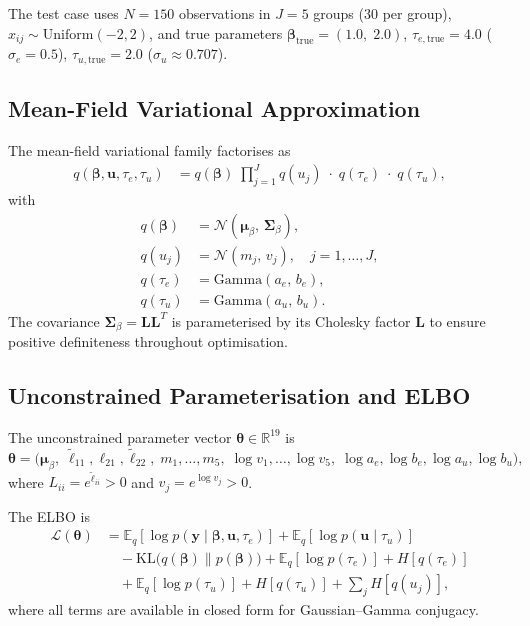 \documentclass[11pt,a4paper]{article}
\newcommand{\E}{\mathbb{E}}
\newcommand{\R}{\mathbb{R}}
\newcommand{\N}{\mathcal{N}}
\begin{document}
The test case uses $N=150$ observations in $J=5$ groups (30 per group),
$x_{ij} \sim \mathrm{Uniform}(-2,2)$, and true parameters
$\bm{\beta}_{\mathrm{true}} = (1.0,\; 2.0)$,
$\tau_{e,\mathrm{true}}=4.0$ ($\sigma_e = 0.5$),
$\tau_{u,\mathrm{true}}=2.0$ ($\sigma_u \approx 0.707$).

\subsection{Mean-Field Variational Approximation}

The mean-field variational family factorises as
\begin{align}
  q(\bm{\beta},\mathbf{u},\tau_e,\tau_u)
  &= q(\bm{\beta})\;\prod_{j=1}^{J} q(u_j)\;\cdot\; q(\tau_e)\;\cdot\; q(\tau_u),
\end{align}
with
\begin{align}
  q(\bm{\beta}) &= \N(\bm{\mu}_\beta,\,\bm{\Sigma}_\beta),\\
  q(u_j) &= \mathcal{N}(m_j,\, v_j), \quad j=1,\ldots,J,\\
  q(\tau_e) &= \mathrm{Gamma}(a_e,\, b_e),\\
  q(\tau_u) &= \mathrm{Gamma}(a_u,\, b_u).
\end{align}
The covariance $\bm{\Sigma}_\beta = \bm{L}\bm{L}^T$ is parameterised by its Cholesky
factor $\bm{L}$ to ensure positive definiteness throughout optimisation.

\subsection{Unconstrained Parameterisation and ELBO}

The unconstrained parameter vector $\bm{\theta} \in \R^{19}$ is
\begin{equation}
  \bm{\theta} = \bigl(\bm{\mu}_\beta,\;
    \tilde{\ell}_{11}, \ell_{21}, \tilde{\ell}_{22},\;
    m_1,\ldots,m_5,\;
    \log v_1,\ldots,\log v_5,\;
    \log a_e, \log b_e, \log a_u, \log b_u
  \bigr),
\end{equation}
where $L_{ii} = e^{\tilde{\ell}_{ii}} > 0$ and $v_j = e^{\log v_j} > 0$.

The ELBO is
\begin{align}
  \mathcal{L}(\bm{\theta})
  &= \E_q\!\left[\log p(\mathbf{y}\mid\bm{\beta},\mathbf{u},\tau_e)\right]
    + \E_q\!\left[\log p(\mathbf{u}\mid\tau_u)\right]
    \nonumber\\
  &\quad - \mathrm{KL}\bigl(q(\bm{\beta})\|p(\bm{\beta})\bigr)
    + \E_q\!\left[\log p(\tau_e)\right] + H[q(\tau_e)]
    \nonumber\\
  &\quad + \E_q\!\left[\log p(\tau_u)\right] + H[q(\tau_u)]
    + \sum_j H[q(u_j)],
\end{align}
where all terms are available in closed form for Gaussian--Gamma conjugacy.
\end{document}
